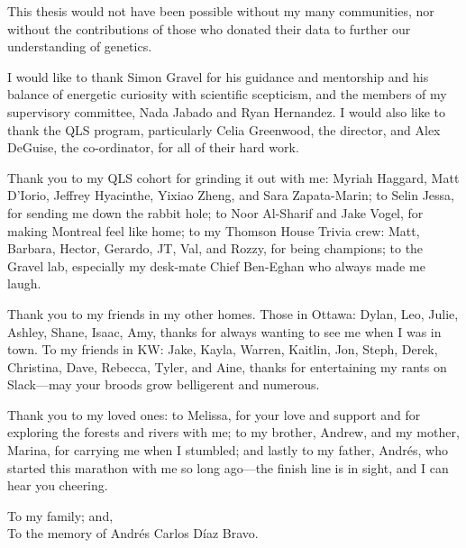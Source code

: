 This thesis would not have been possible without my many communities, nor without the contributions of those who donated their data to further our understanding of genetics.

I would like to thank Simon Gravel for his guidance and mentorship and his balance of energetic curiosity with scientific scepticism, and the members of my supervisory committee, Nada Jabado and Ryan Hernandez. I would also like to thank the QLS program, particularly Celia Greenwood, the director, and Alex DeGuise, the co-ordinator, for all of their hard work.

Thank you to my QLS cohort for grinding it out with me: Myriah Haggard, Matt D'Iorio, Jeffrey Hyacinthe, Yixiao Zheng, and Sara Zapata-Marin; to Selin Jessa, for sending me down the rabbit hole; to Noor Al-Sharif and Jake Vogel, for making Montreal feel like home; to my Thomson House Trivia crew: Matt, Barbara, Hector, Gerardo, JT, Val, and Rozzy, for being champions; to the Gravel lab, especially my desk-mate Chief Ben-Eghan who always made me laugh.

Thank you to my friends in my other homes. Those in Ottawa: Dylan, Leo, Julie, Ashley, Shane, Isaac, Amy, thanks for always wanting to see me when I was in town. To my friends in KW: Jake, Kayla, Warren, Kaitlin, Jon, Steph, Derek, Christina, Dave, Rebecca, Tyler, and Aine, thanks for entertaining my rants on Slack---may your broods grow belligerent and numerous.

Thank you to my loved ones: to Melissa, for your love and support and for exploring the forests and rivers with me; to my brother, Andrew, and my mother, Marina, for carrying me when I stumbled; and lastly to my father, Andr\'{e}s, who started this marathon with me so long ago---the finish line is in sight, and I can hear you cheering.

\pagebreak
\hspace{0pt}
\vfill

\begin{center}
To my family; and, \\
To the memory of Andr\'{e}s Carlos D\'{i}az Bravo.
\end{center}

\vfill
\hspace{0pt}
\pagebreak
